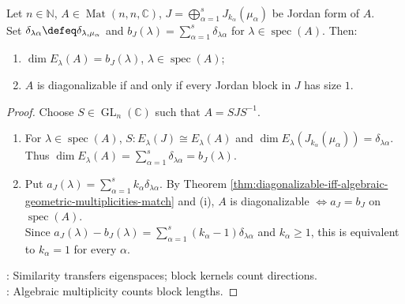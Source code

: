\begin{corollary} \label{cor:jordan-blocks-diagonalizability} \\
Let $n\in\mathbb{N}$, $A\in\operatorname{Mat}(n,n,\mathbb{C})$, $J=\bigoplus\limits_{\alpha=1}^s J_{k_{\alpha}}(\mu_{\alpha})$ be Jordan form of $A$.\\
Set $\delta_{\lambda\alpha}\defeq\delta_{\lambda,\mu_{\alpha}}$ and $b_J(\lambda)=\sum\limits_{\alpha=1}^s\delta_{\lambda\alpha}$ for $\lambda\in\operatorname{spec}(A)$. Then:
\begin{enumerate}[label=(\roman*)]
\setlength{\itemsep}{0pt}
\item $\dim E_{\lambda}(A)=b_J(\lambda)$, $\lambda\in\operatorname{spec}(A)$;
\item $A$ is diagonalizable if and only if every Jordan block in $J$ has size $1$.
\end{enumerate}
\begin{proof}
Choose $S\in\operatorname{GL}_n(\mathbb{C})$ such that $A=SJS^{-1}$.
\begin{enumerate}[label=(\roman*)]
\setlength{\itemsep}{0pt}
\item For $\lambda\in\operatorname{spec}(A)$, $S:E_{\lambda}(J)\cong E_{\lambda}(A)$ and $\dim E_{\lambda}(J_{k_{\alpha}}(\mu_{\alpha}))=\delta_{\lambda\alpha}$. Thus $\dim E_{\lambda}(A)=\sum\limits_{\alpha=1}^s\delta_{\lambda\alpha}=b_J(\lambda)$.
\item Put $a_J(\lambda)=\sum\limits_{\alpha=1}^s k_{\alpha}\delta_{\lambda\alpha}$. By Theorem \ref{thm:diagonalizable-iff-algebraic-geometric-multiplicities-match} and (i), $A$ is diagonalizable $\Longleftrightarrow a_J=b_J$ on $\operatorname{spec}(A)$.\\
Since $a_J(\lambda)-b_J(\lambda)=\sum\limits_{\alpha=1}^s(k_{\alpha}-1)\delta_{\lambda\alpha}$ and $k_{\alpha}\geq1$, this is equivalent to $k_{\alpha}=1$ for every $\alpha$.
\end{enumerate}
: Similarity transfers eigenspaces; block kernels count directions.\\
: Algebraic multiplicity counts block lengths.
\end{proof}
\end{corollary}

